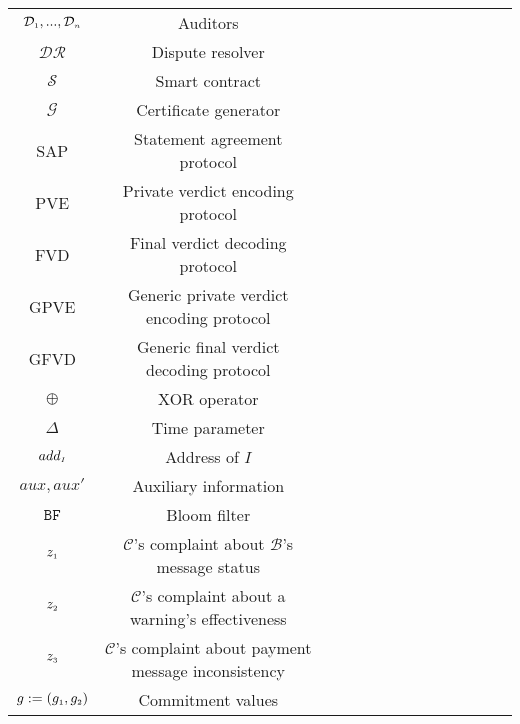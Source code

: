 \begin{table*}[!htb]
\begin{scriptsize}
\begin{center}
{{\begin{tabular}{|c|c|c|c|c|c|c|c|c|c|c|c|c|c|}
%  
\cellcolor{gray!20}\scriptsize$\mathcal{D}_{\scriptscriptstyle 1},... , \mathcal{D}_{\scriptscriptstyle n}$ &\cellcolor{gray!20}\scriptsize Auditors  \\  
%
\cellcolor{white!20}\scriptsize$\mathcal{DR}$ &\cellcolor{white!20}\scriptsize Dispute resolver  \\  
%
\cellcolor{gray!20}\scriptsize$\mathcal{S}$ &\cellcolor{gray!20}\scriptsize Smart contract  \\  
%
\cellcolor{white!20}\scriptsize$\mathcal{G}$ &\cellcolor{white!20}\scriptsize Certificate generator  \\  
%
\cellcolor{gray!20}\scriptsize{SAP} &\cellcolor{gray!20}\scriptsize  Statement agreement protocol\\ 
%
\cellcolor{white!20}\scriptsize{PVE} &\cellcolor{white!20}\scriptsize  Private verdict encoding protocol\\ 
%
\cellcolor{gray!20}\scriptsize{FVD} &\cellcolor{gray!20}\scriptsize  Final verdict decoding protocol\\ 
%
\cellcolor{white!20}\scriptsize{GPVE} &\cellcolor{white!20}\scriptsize  Generic private verdict encoding protocol\\ 
%
\cellcolor{gray!20}\scriptsize{GFVD} &\cellcolor{gray!20}\scriptsize  Generic final verdict decoding protocol\\ 
%
\cellcolor{white!20}\scriptsize$\oplus$ &\cellcolor{white!20}\scriptsize  XOR operator \\ 
%
\cellcolor{gray!20}\scriptsize$\Delta$ &\cellcolor{gray!20}\scriptsize  Time parameter \\ 
%
\cellcolor{white!20}\scriptsize$add_{\scriptscriptstyle I}$ &\cellcolor{white!20}\scriptsize  Address of $I$\\ 
%
\cellcolor{gray!20}\scriptsize$aux, aux'$ &\cellcolor{gray!20}\scriptsize  Auxiliary information\\ 
%
\cellcolor{white!20}\scriptsize$\mathtt{BF}$ &\cellcolor{white!20}\scriptsize  Bloom filter\\ 
%
\cellcolor{gray!20}\scriptsize$z_{\scriptscriptstyle 1}$ &\cellcolor{gray!20}\scriptsize  $\mathcal{C}$'s complaint about $\mathcal{B}$'s message status\\ 
%
\cellcolor{white!20}\scriptsize$z_{\scriptscriptstyle 2}$ &\cellcolor{white!20}\scriptsize  $\mathcal{C}$'s complaint about a warning's effectiveness\\
% 
\cellcolor{gray!20}\scriptsize$z_{\scriptscriptstyle 3}$ &\cellcolor{gray!20}\scriptsize  $\mathcal{C}$'s complaint about payment message  inconsistency\\ 
%
\cellcolor{white!20}\scriptsize $g:=(g_{\scriptscriptstyle 1}, g_{\scriptscriptstyle 2})$&\cellcolor{white!20}\scriptsize  Commitment values \\    
%




\end{tabular}}}
\end{center}
\end{scriptsize}
\end{table*}

